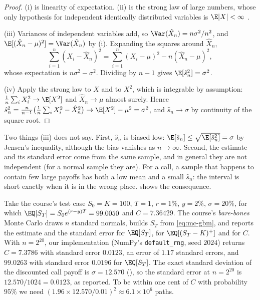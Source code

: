 \begin{proof}
(i) is linearity of expectation. (ii) is the strong law of large numbers, whose only
hypothesis for independent identically distributed variables is $\E|X|<\infty$
\citep[Section~2.4]{durrett}.

(iii) Variances of independent variables add, so $\Var(\hat X_n)=n\sigma^2/n^2$, and
$\E[(\hat X_n-\mu)^2]=\Var(\hat X_n)$ by (i). Expanding the squares around $\hat X_n$,
\[
  \sum_{i=1}^n(X_i-\hat X_n)^2=\sum_{i=1}^n(X_i-\mu)^2-n(\hat X_n-\mu)^2,
\]
whose expectation is $n\sigma^2-\sigma^2$. Dividing by $n-1$ gives $\E[\hat s_n^2]=\sigma^2$.

(iv) Apply the strong law to $X$ and to $X^2$, which is integrable by assumption:
$\frac1n\sum_iX_i^2\to\E[X^2]$ and $\hat X_n\to\mu$ almost surely. Hence
$\hat s_n^2=\frac{n}{n-1}\big(\frac1n\sum_iX_i^2-\hat X_n^2\big)\to\E[X^2]-\mu^2=\sigma^2$,
and $\hat s_n\to\sigma$ by continuity of the square root.
\end{proof}

Two things (iii) does not say. First, $\hat s_n$ is biased low:
$\E[\hat s_n]\le\sqrt{\E[\hat s_n^2]}=\sigma$ by Jensen's inequality, although the bias
vanishes as $n\to\infty$. Second, the estimate and its standard error come from the same
sample, and in general they are not independent (for a normal sample they are). For a call, a sample that
happens to contain few large payoffs has both a low mean and a small $\hat s_n$: the
interval is short exactly when it is in the wrong place.  shows the
consequence.

\begin{example}\label{exa:mc-bbmc}
Take the course's test case $S_0=K=100$, $T=1$, $r=1\%$, $y=2\%$, $\sigma=20\%$, for which
$\EQ[S_T]=S_0e^{(r-y)T}=99.0050$ and $C=7.36429$. The course's \emph{bare-bones} Monte Carlo
draws $n$ standard normals, builds $S_T$ from \eqref{eq:mc-gbm}, and reports the estimate
and the standard error for $\EQ[S_T]$, for $\EQ[(S_T-K)^+]$ and for $C$. With $n=2^{20}$, our
implementation (NumPy's \texttt{default\_rng}, seed $2024$) returns $\hat C=7.3786$ with standard error $0.0123$, an error of $1.17$
standard errors, and $99.0263$ with standard error $0.0196$ for $\EQ[S_T]$. The exact
standard deviation of the discounted call payoff is $\sigma=12.570$
(), so the standard error at $n=2^{20}$ is $12.570/1024=0.0123$,
as reported. To be within one cent of $C$ with probability $95\%$ we need
$(1.96\times12.570/0.01)^2\approx6.1\times10^6$ paths.
\end{example}

